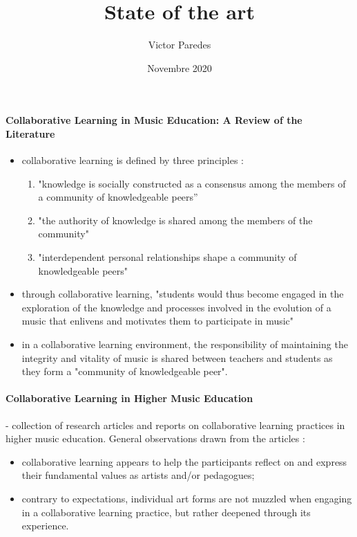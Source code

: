 \documentclass[11pt]{article}
\title{State of the art}
\author{Victor Paredes}
\date{Novembre 2020}
\begin{document}
\maketitle

\tableofcontents

\paragraph{Collaborative Learning in Music Education: A Review of the Literature} \citep{luce_collaborative_2001}

\begin{itemize}
    \item collaborative learning is defined by three principles :
    \begin{enumerate}
        \item "knowledge is socially constructed as a consensus among the members of a community of knowledgeable peers”
        \item "the authority of knowledge is shared among the members of the community"
        \item "interdependent personal relationships shape a community of knowledgeable peers"
    \end{enumerate}
    \item through collaborative learning, "students would thus become engaged in the exploration of the knowledge and processes involved in the evolution of a music that enlivens and motivates them to participate in music"
    \item in a collaborative learning environment, the responsibility of maintaining the integrity and vitality of music is shared between teachers and students as they form a "community of knowledgeable peer".
\end{itemize}

\paragraph{Collaborative Learning in Higher Music Education} \citep{gaunt_collaborative_2016} -
collection of research articles and reports on collaborative learning practices in higher music education. General observations drawn from the articles :

\begin{itemize}
    \item collaborative learning appears to help the participants reflect on and express their fundamental values as artists and/or pedagogues;
    \item contrary to expectations, individual art forms are not muzzled when engaging in a collaborative learning practice, but rather deepened through its experience.
\end{itemize}
\end{document}
